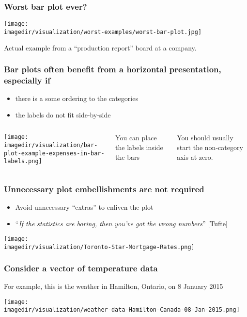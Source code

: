 \begin{frame}\frametitle{Worst bar plot ever?}
	\begin{center}
		\texttt{[image: \\imagedir/visualization/worst-examples/worst-bar-plot.jpg]}
	\end{center}
	Actual example from a ``production report'' board at a company.
\end{frame}

\begin{frame}\frametitle{Bar plots often benefit from a horizontal presentation, especially if}
		\begin{itemize}
			\item	there is a some ordering to the categories 
			\item	the labels do not fit side-by-side
		\end{itemize}
		\begin{columns}[c]
				\centerline{\texttt{[image: \\imagedir/visualization/bar-plot-example-expenses-in-bar-labels.png]}}
				
				{\color{myGreen} You can place the labels inside the bars
				
				\vspace{24pt}
				You should usually start the non-category axis at zero.}
		\end{columns}
\end{frame}

\begin{frame}\frametitle{Unnecessary plot embellishments are not required}
	\begin{itemize}
		\item	Avoid unnecessary ``extras'' to enliven the plot 
		\item	``\emph{If the statistics are boring, then you've got the wrong numbers}'' [Tufte]
	\end{itemize}
	\begin{center}
		\texttt{[image: \\imagedir/visualization/Toronto-Star-Mortgage-Rates.png]}
	\end{center}
\end{frame}

\begin{frame}\frametitle{Consider a vector of temperature data }
	For example, this is the weather in Hamilton, Ontario, on 8 January 2015
	
	\centerline{\texttt{[image: \\imagedir/visualization/weather-data-Hamilton-Canada-08-Jan-2015.png]}}
\end{frame}

